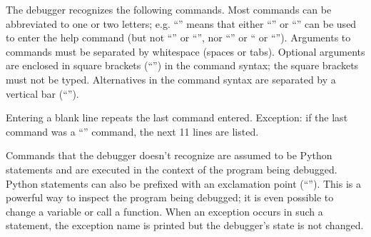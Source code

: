 The debugger recognizes the following commands.  Most commands can be
abbreviated to one or two letters; e.g. ``'' means that
either ``'' or ``'' can be used to enter the help
command (but not ``'' or ``'', nor ``'' or
`` or ``'').  Arguments to commands must be
separated by whitespace (spaces or tabs).  Optional arguments are
enclosed in square brackets (``\code{[]}'') in the command syntax; the
square brackets must not be typed.  Alternatives in the command syntax
are separated by a vertical bar (``\code{|}'').

Entering a blank line repeats the last command entered.  Exception: if
the last command was a ``'' command, the next 11 lines are
listed.

Commands that the debugger doesn't recognize are assumed to be Python
statements and are executed in the context of the program being
debugged.  Python statements can also be prefixed with an exclamation
point (``\code{!}'').  This is a powerful way to inspect the program
being debugged; it is even possible to change a variable or call a
function.  When an
exception occurs in such a statement, the exception name is printed
but the debugger's state is not changed.

